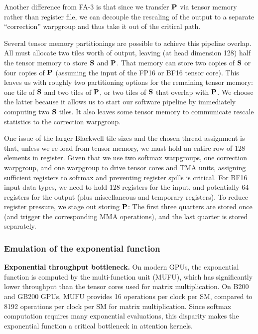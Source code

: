 Another difference from FA-3 is that since we transfer $\mathbf{P}$ via tensor memory rather than register file, we can decouple the rescaling of the output to a separate ``correction'' warpgroup and thus take it out of the critical path.

Several tensor memory partitionings are possible to achieve this pipeline overlap. All must allocate two tiles worth of output, leaving (at head dimension 128) half the tensor memory to store $\mathbf{S}$ and $\mathbf{P}$. That memory can store two copies of $\mathbf{S}$ or four copies of $\mathbf{P}$ (assuming the input of the FP16 or BF16 tensor core).
This leaves us with roughly two partitioning options for the remaining tensor memory: one tile of $\mathbf{S}$ and two tiles of $\mathbf{P}$, or two tiles of $\mathbf{S}$ that overlap with $\mathbf{P}$. We choose the latter because it allows us to start our software pipeline by immediately computing two $\mathbf{S}$ tiles. It also leaves some tensor memory to communicate rescale statistics to the correction warpgroup.

One issue of the larger Blackwell tile sizes and the chosen thread assignment is that, unless we re-load from tensor memory, we must hold an entire row of 128 elements in register.
Given that we use two softmax warpgroups, one correction warpgroup, and one warpgroup to drive tensor cores and TMA units, assigning sufficient registers to softmax and preventing register spills is critical.
For BF16 input data types, we need to hold 128 registers for the input, and potentially 64 registers for the output (plus miscellaneous and temporary registers).
To reduce register pressure, we stage out storing $\mathbf{P}$: The first three quarters are stored once (and trigger the corresponding MMA operations), and the last quarter is stored separately.

\subsubsection{Emulation of the exponential function}

\textbf{Exponential throughput bottleneck.}
On modern GPUs, the exponential function is computed by the multi-function unit (MUFU), which has significantly lower throughput than the tensor cores used for matrix multiplication. On B200 and GB200 GPUs, MUFU provides 16 operations per clock per SM, compared to 8192 operations per clock per SM for matrix multiplication. Since softmax computation requires many exponential evaluations, this disparity makes the exponential function a critical bottleneck in attention kernels.

